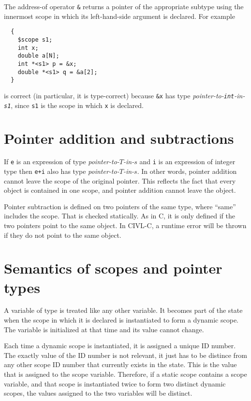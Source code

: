 The address-of operator \texttt{\&} returns a pointer of the
appropriate subtype using the innermost scope in which its left-hand-side
argument is declared.  For example

\begin{verbatim}
  {
    $scope s1;
    int x;
    double a[N];
    int *<s1> p = &x;
    double *<s1> q = &a[2];
  }
\end{verbatim}
is correct (in particular, it is type-correct) because \texttt{\&x}
has type \emph{pointer-to-\texttt{int}-in-\texttt{s1}}, since
\texttt{s1} is the scope in which \texttt{x} is declared.

\section{Pointer addition and subtractions}

If \texttt{e} is an expression of type \emph{pointer-to-$T$-in-$s$}
and \texttt{i} is an expression of integer type then \texttt{e+i} also
has type \emph{pointer-to-$T$-in-$s$}.  In other words, pointer
addition cannot leave the scope of the original pointer.  This
reflects the fact that every object is contained in one scope, and
pointer addition cannot leave the object.


Pointer subtraction is defined on two pointers of the same type, where
``same'' includes the scope.  That is checked statically.  As in C, it
is only defined if the two pointers point to the same object.  In
CIVL-C, a runtime error will be thrown if they do not point to the
same object.

\section{Semantics of scopes and pointer types}

A variable of type \cscope{} is treated like any other variable.
It becomes part of the state when the scope in which it is declared
is instantiated to form a dynamic scope.  The variable is 
initialized  at that time and its value cannot change.

Each time a dynamic scope is instantiated, it is assigned a unique ID
number.  The exactly value of the ID number is not relevant, it just
has to be distince from any other scope ID number that currently
exists in the state.  This is the value that is assigned to the scope
variable.  Therefore, if a static scope contains a scope variable, and
that scope is instantiated twice to form two distinct dynamic scopes,
the values assigned to the two variables will be distinct.

